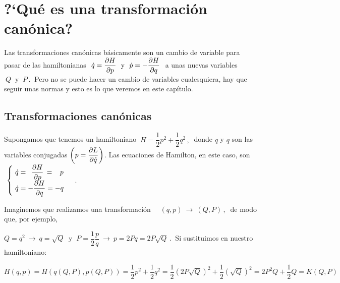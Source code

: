 \chapter{?`Qué es una transformación canónica?}



\vspace{10mm}
\begin{adjustwidth}{50pt}{50pt}
\begin{ejemplo}

Las transformaciones canónicas básicamente son un cambio de variable para pasar de las hamiltonianas $\ \displaystyle \dot q=\pdv{H}{p} \ \text{ y } \ \dot p=-\pdv{H}{q} \ $ a unas nuevas variables $\ Q \ \text { y } \ P \, . \ $ Pero  no se puede hacer un cambio de variables cualesquiera, hay que seguir unas normas y esto es lo que veremos en este capítulo.

\end{ejemplo}
\end{adjustwidth}
\vspace{5mm}
\section{Transformaciones canónicas}
\vspace{5mm}
Supongamos que tenemos un hamiltoniano $\ H=\dfrac 1 2 p^2+\dfrac 1 2 q^2 \, , \ $ donde $q$ y $q$ son las variables conjugadas $\left( p=\displaystyle \pdv{L}{\dot q} \right)$. Las ecuaciones de Hamilton, en este caso, son $\ \begin{cases} \ \displaystyle \dot q=\ \, \pdv{H}{p} \, = \, \ \ p\\ \ \displaystyle \dot q=-\pdv{H}{q}=-q \end{cases}\ $. 


Imaginemos que realizamos una transformación $\quad  (q,p) \ \to \ (Q,P)\, , \ $ de modo que, por ejemplo,  

$Q=q^2 \ \to \ q=\sqrt{Q}\ $ y $\ P=\dfrac 1 2 \dfrac p q \ \to \ p=2Pq=2P\sqrt{Q}\, . \ $ Si sustituimos en nuestro hamiltoniano:

$\displaystyle H(q,p)=H(q(Q,P),p(Q,P))=\dfrac 1 2 p^2+\dfrac 1 2 q^2 = \dfrac 1 2 (2P\sqrt{Q})^2+\dfrac 1 2 (\sqrt{Q})^2=2P^2Q+\dfrac 1 2 Q=K(Q,P)$

